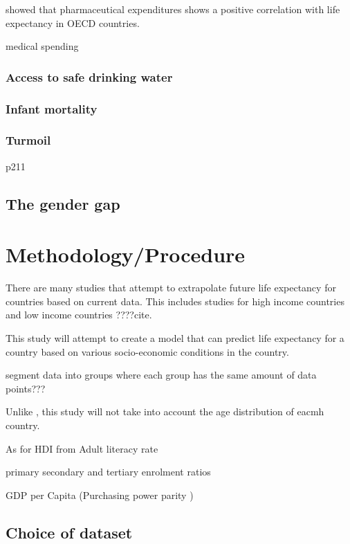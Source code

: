 \documentclass[10pt,a4paper]{article}
\begin{document}
\cite{Shaw2005} showed that pharmaceutical expenditures shows a positive correlation with life expectancy in OECD countries.

medical spending \cite{Cutler2006}

\subsubsection{Access to safe drinking water}

\subsubsection{Infant mortality}

\cite{CDC1999}

\subsubsection{Turmoil}
\citep{Low2008} p211

\subsection{The gender gap}

\cite{Rochelle2015}

\section{Methodology/Procedure}

There are many studies that attempt to extrapolate future life expectancy for countries based on current data. This includes studies for high income countries \citep{Kontis2017} and low income countries ????{cite}.

This study will attempt to create a model that can predict life expectancy for a country based on various socio-economic conditions in the country.



segment data into groups where each group has the same amount of data points???

Unlike \cite{Shaw2005}, this study will not take into account the age distribution of eacmh country.

As for HDI from \cite{Bulled2010}
Adult literacy rate

primary secondary and tertiary enrolment ratios

GDP per Capita (Purchasing power parity )

\subsection{Choice of dataset}
\end{document}
